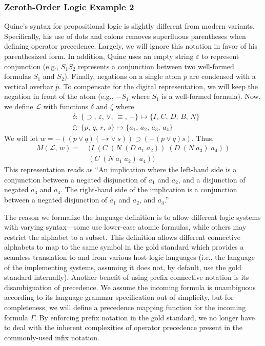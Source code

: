 \documentclass[ms]{uncgdissertationexp2}
\theoremstyle{plain}
\theoremstyle{definition}
\theoremstyle{remark}
\begin{document}
\subsubsection{Zeroth-Order Logic Example 2}
Quine's \cite{methodsoflogic} syntax for propositional logic is slightly different from modern variants. Specifically, his use of dots and colons removes superfluous parentheses when defining operator precedence. Largely, we will ignore this notation in favor of his parenthesized form. In addition, Quine uses an empty string $\varepsilon$ to represent conjunction (e.g., $S_{1}S_{2}$ represents a conjunction between two well-formed formulas $S_{1}$ and $S_{2}$). Finally, negations on a single atom $p$ are condensed with a vertical overbar $\overline{p}$. To compensate for the digital representation, we will keep the negation in front of the atom (e.g., $-S_1$ where $S_1$ is a well-formed formula). Now, we define $\mathcal{L}$ with functions $\delta$ and $\zeta$ where
\begin{align*}
	& \delta:\;\{\supset,\,\varepsilon,\,\lor,\,\equiv,\,-\}\mapsto \{I,\,C,\,D,\,B,\,N\} \\
	& \zeta:\;\{p,\,q,\,r,\,s\} \mapsto \{a_{1},\,a_{2},\,a_{3},\,a_{4}\}  
\end{align*}
We will let $w = -((p\lor q)(-r\lor s)) \supset (-(p\lor q)s)$. Thus,
\begin{align*}
	M(\mathcal{L},\,w) =\;&(I\;(C\;(N\;(D\;a_1\;a_2))\;(D\;(N\;a_3)\;a_4))\\
					   	 &(C\;(N\;a_1\;a_2)\;a_4))
\end{align*}
This representation reads as ``An implication where the left-hand side is a conjunction between a negated disjunction of $a_1$ and $a_2$, and a disjunction of negated $a_3$ and $a_4$. The right-hand side of the implication is a conjunction between a negated disjunction of $a_1$ and $a_2$, and $a_4$.''

The reason we formalize the language definition is to allow different logic systems with varying syntax---some use lower-case atomic formulas, while others may restrict the alphabet to a subset. This definition allows different connective alphabets to map to the same symbol in the gold standard which provides a seamless translation to and from various host logic languages (i.e., the language of the implementing systems, assuming it does not, by default, use the gold standard internally). Another benefit of using prefix connective notation is its disambiguation of precedence. We assume the incoming formula is unambiguous according to its language grammar specification out of simplicity, but for completeness, we will define a precedence mapping function for the incoming formula $\Gamma$. By enforcing prefix notation in the gold standard, we no longer have to deal with the inherent complexities of operator precedence present in the commonly-used infix notation.
\end{document}
